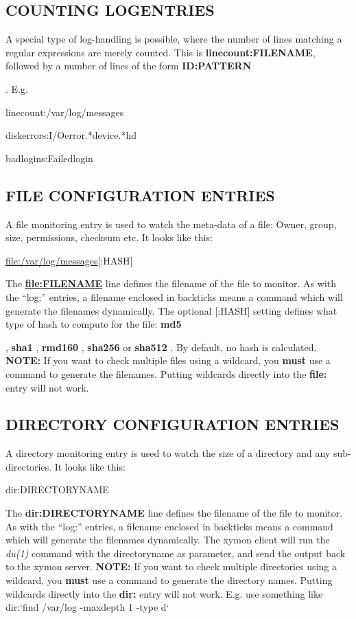  
\subsection{COUNTING LOGENTRIES}
 A special type of log-handling is possible, where the number of lines
 matching a regular expressions are merely counted. This is
 \textbf{linecount:FILENAME}, followed by a number of lines of the
 form \textbf{ID:PATTERN}

. E.g. 

  
linecount:/var/log/messages  
 
diskerrors:I/Oerror.*device.*hd  
 
badlogins:Failedlogin 


 


 
\subsection{FILE CONFIGURATION ENTRIES}
 A file monitoring entry is used to watch the meta-data of a file:
 Owner, group, size, permissions, checksum etc. It looks like this: 


  
\url{file:/var/log/messages}[:HASH] 


  The \textbf{\url{file:FILENAME}}
 line defines the filename of the file to monitor. As with the
 ``log:'' entries, a filename enclosed in backticks means a command
 which will generate the filenames dynamically. The optional [:HASH]
 setting defines what type of hash to compute for the file:
 \textbf{md5}

, \textbf{sha1}
, \textbf{rmd160}
, \textbf{sha256}
 or \textbf{sha512}
. By default, no hash is calculated.  
\textbf{NOTE:}
 If you want to check multiple files using a wildcard, you \textbf{must}
 use a command to generate the filenames. Putting wildcards directly into the \textbf{file:}
 entry will not work. 


 
\subsection{DIRECTORY CONFIGURATION ENTRIES}
 A directory monitoring entry is used to watch the size of a directory and any sub-directories. It looks like this: 

  
dir:DIRECTORYNAME 


  The \textbf{dir:DIRECTORYNAME}
 line defines the filename of the file to monitor. As with the ``log:'' entries, a filename enclosed in backticks means a command which will generate the filenames dynamically. The xymon client will run the \emph{du(1)}
 command with the directoryname as parameter, and send the output back to the xymon server.  
\textbf{NOTE:}
 If you want to check multiple directories using a wildcard, you \textbf{must}
 use a command to generate the directory names. Putting wildcards directly into the \textbf{dir:}
 entry will not work. E.g. use something like  
dir:`find /var/log -maxdepth 1 -type d` 



